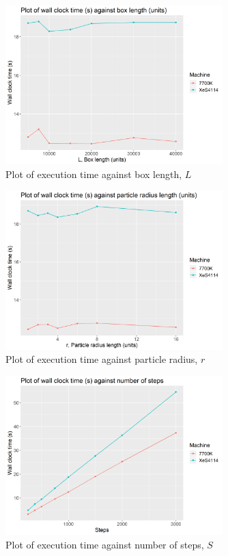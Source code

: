 \documentclass[12pt]{article}
\begin{document}
\begin{figure}[H]
    \centering
    \includegraphics[width=0.75\textwidth]{seq-varyL}
    \caption{Plot of execution time against box length, $L$}
    \label{fig:seq-varyL}
\end{figure}

\begin{figure}[H]
    \centering
    \includegraphics[width=0.75\textwidth]{seq-varyR}
    \caption{Plot of execution time against particle radius, $r$}
    \label{fig:seq-varyR}
\end{figure}

\begin{figure}[H]
    \centering
    \includegraphics[width=0.75\textwidth]{seq-varySteps}
    \caption{Plot of execution time against number of steps, $S$}
    \label{fig:seq-varySteps}
\end{figure}
\end{document}
